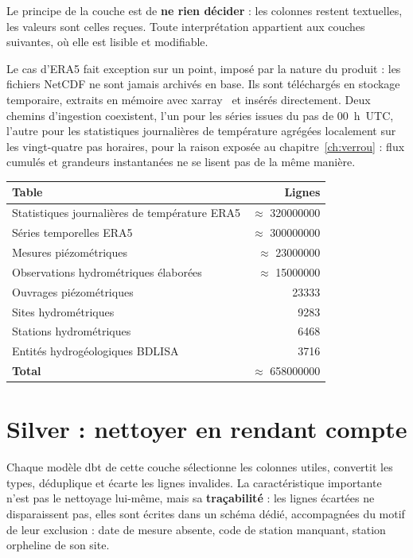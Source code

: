 Le principe de la couche est de \textbf{ne rien décider} : les colonnes restent textuelles,
les valeurs sont celles reçues. Toute interprétation appartient aux couches suivantes, où elle
est lisible et modifiable.

Le cas d'ERA5 fait exception sur un point, imposé par la nature du produit : les fichiers
NetCDF ne sont jamais archivés en base. Ils sont téléchargés en stockage temporaire, extraits en
mémoire avec xarray~\cite{xarray} et insérés directement. Deux chemins d'ingestion coexistent, l'un pour
les séries issues du pas de \SI{00}{\hour}~UTC, l'autre pour les statistiques journalières de
température agrégées localement sur les vingt-quatre pas horaires, pour la raison exposée au
chapitre~\ref{ch:verrou} : flux cumulés et grandeurs instantanées ne se lisent pas de la même
manière.

\begin{center}
\begin{tabularx}{\textwidth}{@{}Xr@{}}
\toprule
\textbf{Table} & \textbf{Lignes} \\
\midrule
Statistiques journalières de température ERA5 & $\approx$ \num{320000000} \\
Séries temporelles ERA5 & $\approx$ \num{300000000} \\
Mesures piézométriques & $\approx$ \num{23000000} \\
Observations hydrométriques élaborées & $\approx$ \num{15000000} \\
Ouvrages piézométriques & \num{23333} \\
Sites hydrométriques & \num{9283} \\
Stations hydrométriques & \num{6468} \\
Entités hydrogéologiques BDLISA & \num{3716} \\
\midrule
\textbf{Total} & $\approx$ \num{658000000} \\
\bottomrule
\end{tabularx}
\end{center}

\section{Silver : nettoyer en rendant compte}

Chaque modèle dbt de cette couche sélectionne les colonnes utiles, convertit les types,
déduplique et écarte les lignes invalides. La caractéristique importante n'est pas le nettoyage
lui-même, mais sa \textbf{traçabilité} : les lignes écartées ne disparaissent pas, elles sont
écrites dans un schéma dédié, accompagnées du motif de leur exclusion : date de mesure absente,
code de station manquant, station orpheline de son site.

